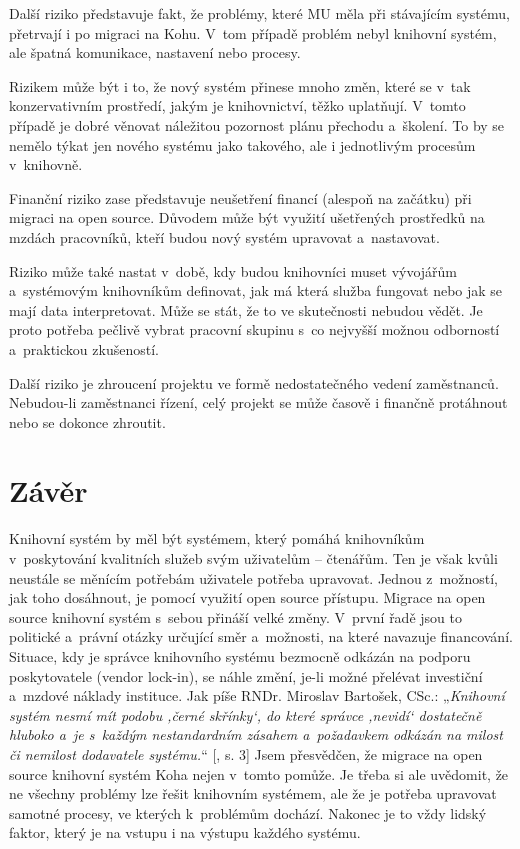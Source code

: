 \documentclass[
	11pt, oneside, printed, final, palatino
	microtype,
	table,   %
	lof,     %
	lot     %
]{fithesis3}
\makeatletter
\newcommand{\citepages}[2]{[\cite{#2}, s. #1]}
\newcommand{\citace}[1]{„\textit{#1}“} %
\makeatother
\begin{document}
{Další riziko představuje fakt, že problémy, které MU měla při stávajícím systému, přetrvají i po migraci na Kohu. V~tom případě problém nebyl knihovní systém, ale špatná komunikace, nastavení nebo procesy.

Rizikem může být i to, že nový systém přinese mnoho změn, které se v~tak konzervativním prostředí, jakým je knihovnictví, těžko uplatňují. V~tomto případě je dobré věnovat náležitou pozornost plánu přechodu a~školení. To by se nemělo týkat jen nového systému jako takového, ale i jednotlivým procesům v~knihovně.

Finanční riziko zase představuje neušetření financí (alespoň na začátku) při migraci na open source. Důvodem může být využití ušetřených prostředků na mzdách pracovníků, kteří budou nový systém upravovat a~nastavovat. 

Riziko může také nastat v~době, kdy budou knihovníci muset vývojářům a~systémovým knihovníkům definovat, jak má která služba fungovat nebo jak se mají data interpretovat. Může se stát, že to ve skutečnosti nebudou vědět. Je proto potřeba pečlivě vybrat pracovní skupinu s~co nejvyšší možnou odborností a~praktickou zkušeností.

Další riziko je zhroucení projektu ve formě nedostatečného vedení zaměstnanců. Nebudou-li zaměstnanci řízení, celý projekt se může časově i finančně protáhnout nebo se dokonce zhroutit.

\chapter*{Závěr}
Knihovní systém by měl být systémem, který pomáhá knihovníkům v~poskytování kvalitních služeb svým uživatelům – čtenářům. Ten je však kvůli neustále se měnícím potřebám uživatele potřeba upravovat. Jednou z~možností, jak toho dosáhnout, je pomocí využití open source přístupu. Migrace na open source knihovní systém s~sebou přináší velké změny. V~první řadě jsou to politické a~právní otázky určující směr a~možnosti, na které navazuje financování. Situace, kdy je správce knihovního systému bezmocně odkázán na podporu poskytovatele (vendor lock-in), se náhle změní, je-li možné přelévat investiční a~mzdové náklady instituce. Jak píše RNDr. Miroslav Bartošek, CSc.: \citace{Knihovní systém nesmí mít podobu ‚černé skřínky‘, do které správce ‚nevidí‘ dostatečně hluboko a~je s~každým nestandardním zásahem a~požadavkem odkázán na milost či nemilost dodavatele systému.} \citepages{3}{bartosek_2001_systemovy_pohled}
 Jsem přesvědčen, že migrace na open source knihovní systém Koha nejen v~tomto pomůže. Je třeba si ale uvědomit, že ne všechny problémy lze řešit knihovním systémem, ale že je potřeba upravovat samotné procesy, ve kterých k~problémům dochází. Nakonec je to vždy lidský faktor, který je na vstupu i na výstupu každého systému. 
 
}
\end{document}
